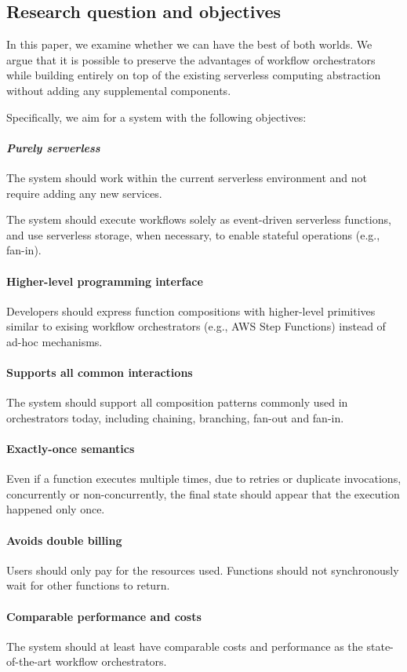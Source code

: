 \subsection{Research question and objectives}

In this paper, we examine whether we can have the best of both worlds. We
argue that it is possible to preserve the advantages of workflow orchestrators
while building entirely on top of the existing serverless computing
abstraction without adding any supplemental components.

Specifically, we aim for a system with the following objectives:

\paragraph{\emph{Purely serverless}} The system should work within the current
serverless environment and not require adding any new services.

The system should execute workflows solely as event-driven serverless
functions, and use serverless storage, when necessary, to enable stateful
operations (e.g., fan-in).

\paragraph{Higher-level programming interface} Developers should express
function compositions with higher-level primitives similar to exising workflow
orchestrators (e.g., AWS Step Functions) instead of ad-hoc mechanisms.

\paragraph{Supports all common interactions} The system should support all
composition patterns commonly used in orchestrators today, including chaining,
branching, fan-out and fan-in.

\paragraph{Exactly-once semantics} Even if a function executes multiple times,
due to retries or duplicate invocations, concurrently or non-concurrently, the
final state should appear that the execution happened only once.

\paragraph{Avoids double billing} Users should only pay for the resources
used. Functions should not synchronously wait for other functions to return.

\paragraph{Comparable performance and costs} The system should at least have
comparable costs and performance as the state-of-the-art workflow
orchestrators.

